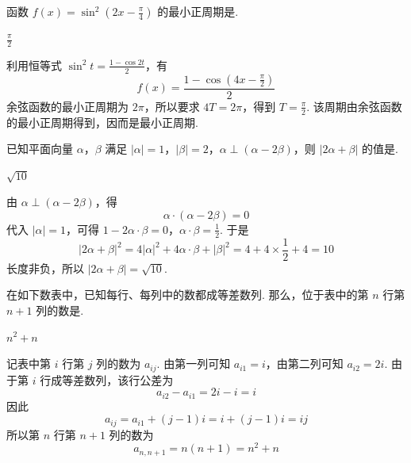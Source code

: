 \begin{problem}
函数 \(f(x) = \sin^2\left(2x - \frac{\pi}{4}\right)\) 的最小正周期是\fillinblank{}.

\begin{answer}
\(\frac{\pi}{2}\)
\end{answer}

\begin{solution}
利用恒等式 \(\sin^2t=\frac{1-\cos2t}{2}\)，有
\[
f(x)=\frac{1-\cos\left(4x-\frac{\pi}{2}\right)}{2}
\]
余弦函数的最小正周期为 \(2\pi\)，所以要求
\(4T=2\pi\)，得到 \(T=\frac{\pi}{2}\). 该周期由余弦函数的最小正周期得到，因而是最小正周期.
\end{solution}
\end{problem}

\begin{problem}
已知平面向量 \(\alpha\)，\(\beta\) 满足 \(|\alpha| = 1\)，\(|\beta| = 2\)，\(\alpha \perp (\alpha - 2\beta)\)，则 \(|2\alpha + \beta|\) 的值是\fillinblank{}.

\begin{answer}
\(\sqrt{10}\)
\end{answer}

\begin{solution}
由 \(\alpha\perp(\alpha-2\beta)\)，得
\[
\alpha\cdot(\alpha-2\beta)=0
\]
代入 \(|\alpha|=1\)，可得
\(1-2\alpha\cdot\beta=0\)，\(\alpha\cdot\beta=\frac12\).
于是
\[
|2\alpha+\beta|^2
=4|\alpha|^2+4\alpha\cdot\beta+|\beta|^2
=4+4\times\frac12+4=10
\]
长度非负，所以 \(|2\alpha+\beta|=\sqrt{10}\).
\end{solution}
\end{problem}

\begin{problem}
在如下数表中，已知每行、每列中的数都成等差数列.
那么，位于表中的第 \(n\) 行第 \(n + 1\) 列的数是\fillinblank{}.

\begin{answer}
\(n^2+n\)
\end{answer}

\begin{solution}
记表中第 \(i\) 行第 \(j\) 列的数为 \(a_{ij}\). 由第一列可知
\(a_{i1}=i\)，由第二列可知 \(a_{i2}=2i\). 由于第 \(i\) 行成等差数列，该行公差为
\[
a_{i2}-a_{i1}=2i-i=i
\]
因此
\[
a_{ij}=a_{i1}+(j-1)i=i+(j-1)i=ij
\]
所以第 \(n\) 行第 \(n+1\) 列的数为
\[
a_{n,n+1}=n(n+1)=n^2+n
\]
\end{solution}
\end{problem}

